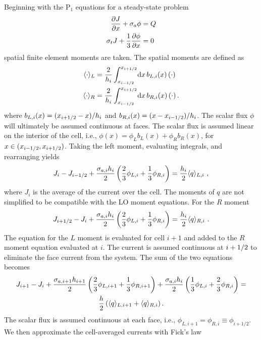 Beginning with the P$_1$ equations for a steady-state problem
\begin{align}\label{eq:dsa_bal}
    \frac{\partial J}{\partial x} + \sigma_a \phi &= Q \\ \label{eq:p1}
    \sigma_t J + \frac{1}{3} \frac{\partial \phi}{\partial x} &= 0 \\
\end{align}
spatial finite element moments are taken. The spatial moments are defined as
\begin{align}
    \langle \cdot \rangle_L &= \frac{2}{h_i} \int_{{x_{i-1/2}}}^{{x_{i+1/2}}} \! \mathrm{d} x \,b_{L,i}(x)    \left( \cdot \right) \\
    \langle \cdot \rangle_R &= \frac{2}{h_i} \int_{{x_{i-1/2}}}^{{x_{i+1/2}}} \! \mathrm{d} x \,b_{R,i}(x) \left( \cdot \right).
\end{align}
where $b_{L,i}(x) = ({x_{i+1/2}} - x)/h_i$ and $b_{R,i}(x) = (x - {x_{i-1/2}})/h_i$.
The scalar flux $\phi$ will ultimately be assumed continuous at faces. The scalar
flux is assumed linear on the interior of the cell, i.e.,
$\phi(x)=\phi_Lb_L(x) + \phi_Rb_R(x)$, for $x\in({x_{i-1/2}},{x_{i+1/2}})$.   Taking the left moment,
evaluating integrals, and rearranging yields
\begin{equation}
    J_{i} - J_{{i-1/2}}  + \frac{\sigma_{a,i}h_i}{2} \left(\frac{2}{3} \phi_{L,i} + \frac{1}{3}
    \phi_{R,i} \right) = \frac{h_i}{2} \langle q \rangle_{L,i}\,\,,
\end{equation}
where $J_i$ is the average of the current over the cell. The moments of $q$ are
not simplified to be compatible with the LO moment equations. For the $R$ moment
\begin{equation}
    J_{i+1/2} - J_{i}  + \frac{\sigma_{a,i}h_i}{2} \left(\frac{2}{3} \phi_{L,i} + \frac{1}{3}
    \phi_{R,i} \right) = \frac{h_i}{2} \langle q \rangle_{R,i}\,\,.
\end{equation}
The equation for the $L$ moment is evaluated for cell $i+1$ and added to the $R$ moment
equation evaluated at $i$.  The current is assumed continuous at ${i+1/2}$ to eliminate
the face current from the system.  The sum of the two equations becomes
\begin{multline}
    J_{i+1} - J_{i} + \frac{\sigma_{a,i+1} h_{i+1}}{2}\left(\frac{2}{3} \phi_{L,i+1} +
    \frac{1}{3}\phi_{R,i+1}\right) + \frac{\sigma_{a,i} h_i}{2} \left( \frac{1}{3} \phi_{L,i} +
    \frac{2}{3}\phi_{R,i}\right) =\\ \frac{h}{2} \left(\langle q \rangle_{L,i+1} + \langle q \rangle_{R,i}
    \right).
\end{multline}
The scalar flux is assumed continuous at each face, i.e., $\phi_{L,i+1} = \phi_{R,i}
\equiv \phi_{i+1/2}$.  We then approximate the cell-averaged currents with Fick's law
